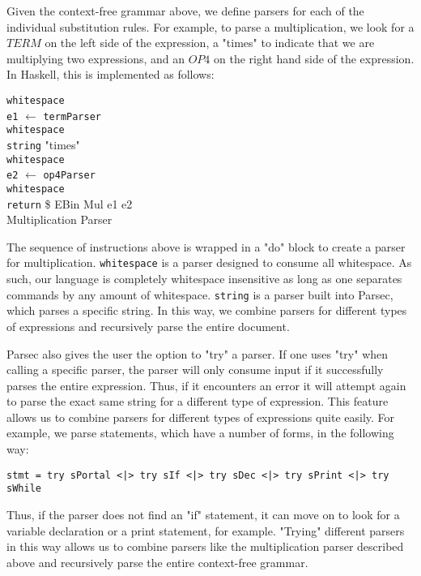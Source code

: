 \documentclass[preprint]{sigplanconf}
\begin{document}
Given the context-free grammar above, we define parsers for each of the individual substitution rules. For example, to parse a multiplication, we look for a $TERM$ on the left side of the expression, a "times" to indicate that we are multiplying two expressions, and an $OP4$ on the right hand side of the expression. In Haskell, this is implemented as follows:

\begin{algorithm}
	\texttt{whitespace} \\
	\texttt{e1} $\leftarrow$ \texttt{termParser}\\
	\texttt{whitespace} \\
	\texttt{string} "times" \\
	\texttt{whitespace} \\
	\texttt{e2} $\leftarrow$ \texttt{op4Parser} \\
	\texttt{whitespace} \\
	\texttt{return} \$ EBin Mul e1 e2  \\
	\caption{Multiplication Parser}
\end{algorithm}

The sequence of instructions above is wrapped in a "do" block to create a parser for multiplication. \texttt{whitespace} is a parser designed to consume all whitespace. As such, our language is completely whitespace insensitive as long as one separates commands by any amount of whitespace. \texttt{string} is a parser built into Parsec, which parses a specific string. In this way, we combine parsers for different types of expressions and recursively parse the entire document. 

Parsec also gives the user the option to "try" a parser. If one uses "try" when calling a specific parser, the parser will only consume input if it successfully parses the entire expression. Thus, if it encounters an error it will attempt again to parse the exact same string for a different type of expression. This feature allows us to combine parsers for different types of expressions quite easily. For example, we parse statements, which have a number of forms, in the following way:

\texttt{stmt = try sPortal <|> try sIf <|> try sDec <|> try sPrint <|> try sWhile}

Thus, if the parser does not find an "if" statement, it can move on to look for a variable declaration or a print statement, for example. "Trying" different parsers in this way allows us to combine parsers like the multiplication parser described above and recursively parse the entire context-free grammar. 
\end{document}

